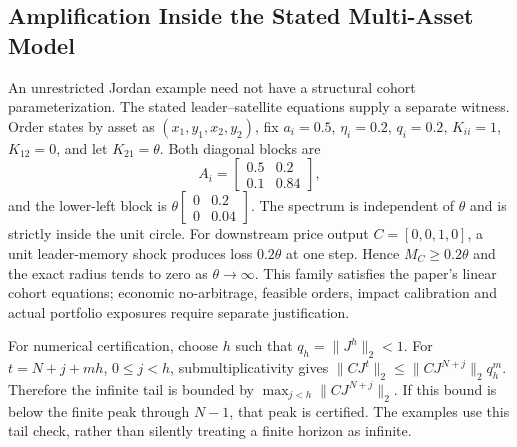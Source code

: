 \subsection{Amplification Inside the Stated Multi-Asset Model}
An unrestricted Jordan example need not have a structural cohort parameterization. The stated leader--satellite equations supply a separate witness. Order states by asset as $(x_1,y_1,x_2,y_2)$, fix $a_i=0.5$, $\eta_i=0.2$, $q_i=0.2$, $K_{ii}=1$, $K_{12}=0$, and let $K_{21}=\theta$. Both diagonal blocks are
\[
A_i=\begin{bmatrix}0.5&0.2\\0.1&0.84\end{bmatrix},
\]
and the lower-left block is $\theta\left[\begin{smallmatrix}0&0.2\\0&0.04\end{smallmatrix}\right]$. The spectrum is independent of $\theta$ and is strictly inside the unit circle. For downstream price output $C=[0,0,1,0]$, a unit leader-memory shock produces loss $0.2\theta$ at one step. Hence $M_C\ge0.2\theta$ and the exact radius tends to zero as $\theta\to\infty$. This family satisfies the paper's linear cohort equations; economic no-arbitrage, feasible orders, impact calibration and actual portfolio exposures require separate justification.

For numerical certification, choose $h$ such that $q_h=\|J^h\|_2<1$. For $t=N+j+mh$, $0\le j<h$, submultiplicativity gives $\|CJ^t\|_2\le\|CJ^{N+j}\|_2q_h^m$. Therefore the infinite tail is bounded by $\max_{j<h}\|CJ^{N+j}\|_2$. If this bound is below the finite peak through $N-1$, that peak is certified. The examples use this tail check, rather than silently treating a finite horizon as infinite.

